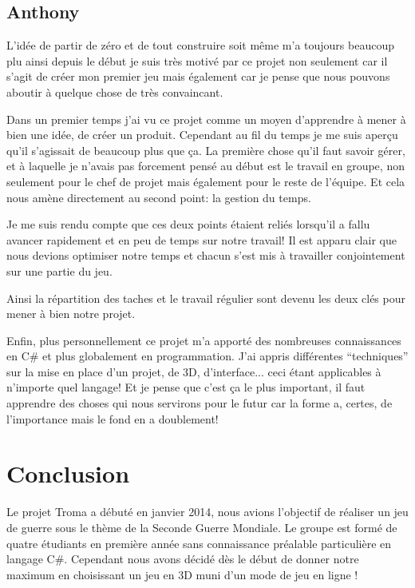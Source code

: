 \documentclass[11pt]{report}
\begin{document}
\section{Anthony}

L'idée de partir de zéro et de tout construire soit même m'a toujours beaucoup plu ainsi depuis le début je suis très motivé par ce projet non seulement car il s'agit de créer mon premier jeu mais également car je pense que nous pouvons aboutir à quelque chose de très convaincant.

Dans un premier temps j'ai vu ce projet comme un moyen d'apprendre à mener à bien une idée, de créer un produit. Cependant au fil du temps je me suis aperçu qu'il s'agissait de beaucoup plus que ça. La première chose qu'il faut savoir gérer, et à laquelle je n'avais pas forcement pensé au début est le travail en groupe, non seulement pour le chef de projet mais également pour le reste de l'équipe. Et cela nous amène directement au second point: la gestion du temps.

Je me suis rendu compte que ces deux points étaient reliés lorsqu'il a fallu avancer rapidement et en peu de temps sur notre travail! Il est apparu clair que nous devions optimiser notre temps et chacun s'est mis à travailler conjointement sur une partie du jeu.

Ainsi la répartition des taches et le travail régulier sont devenu les deux clés pour mener à bien notre projet.

Enfin, plus personnellement ce projet m'a apporté des nombreuses connaissances en C\# et plus globalement en programmation. J'ai appris différentes ``techniques''  sur la mise en place d'un projet, de 3D, d'interface... ceci étant applicables à n'importe quel langage! Et je pense que c'est ça le plus important, il faut apprendre des choses qui nous servirons pour le futur car la forme a, certes, de l'importance mais le fond en a doublement!

\chapter*{Conclusion}

Le projet Troma a débuté en janvier 2014, nous avions l'objectif de réaliser un jeu de guerre sous le thème de la Seconde Guerre Mondiale. Le groupe est formé de quatre étudiants en première année sans connaissance préalable particulière en langage C\#. Cependant nous avons décidé dès le début de donner notre maximum en choisissant un jeu en 3D muni d'un mode de jeu en ligne ! 
\end{document}
